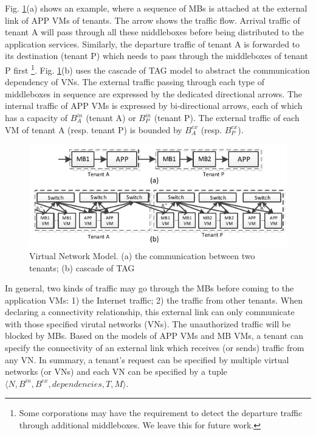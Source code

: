 \documentclass[review]{elsarticle}
\begin{document}
Fig. \ref{fig:abstraction}(a) shows an example, where a sequence of MBs is attached at the external link of APP VMs of tenants. The arrow shows the traffic flow. Arrival traffic of tenant A will pass through all these middleboxes before being distributed to the application services. Similarly,  the departure traffic of tenant A is forwarded to its destination (tenant P) which needs to pass through the middleboxes of tenant P first \footnote{Some corporations may have the requirement to detect the departure traffic through additional middleboxes. We leave this for future work. }.  Fig. \ref{fig:abstraction}(b) uses the cascade of TAG model to abstract the communication dependency of VNs. The external traffic passing through each type of middleboxes in sequence are expressed by the dedicated directional arrows. The internal traffic of APP VMs is expressed by bi-directional arrows, each of which has a capacity of $B_{A}^{in}$ (tenant A) or $B_{P}^{in}$ (tenant P). The external traffic of each VM of tenant A (resp. tenant P) is bounded by $B_{A}^{ex}$ (resp. $B_{P}^{ex}$). 
\begin{figure}
	\centering
		\includegraphics[width=3.5 in]{fig/abstraction.pdf}
	\caption{Virtual Network Model. (a) the communication between two tenants; (b) cascade of TAG}
	\label{fig:abstraction}
\end{figure}

In general, two kinds of traffic may go through the MBs before coming to the application VMs: 1) the Internet traffic; 2) the traffic from other tenants. When declaring a connectivity relationship, this external link can only communicate with those specified virutal networks (VNs). The unauthorized traffic will be blocked by MBs. Based on the models of APP VMs and MB VMs, a tenant can specify the connectivity of an external link which receives (or sends) traffic from any VN. In summary, a tenant's request can be specified by multiple virtual networks (or VNs) and each VN can be specified by a tuple $\langle N, B^{in}, B^{ex}, dependencies, T, M\rangle$. 
\end{document}
